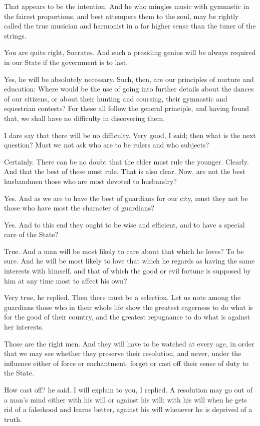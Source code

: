 That appears to be the intention.
And he who mingles music with gymnastic in the fairest proportions, and best attempers them to the soul, may be rightly called the true musician and harmonist in a far higher sense than the tuner of the strings.

You are quite right, Socrates.
And such a presiding genius will be always required in our State if the government is to last.

Yes, he will be absolutely necessary.
Such, then, are our principles of nurture and education: Where would be the use of going into further details about the dances of our citizens, or about their hunting and coursing, their gymnastic and equestrian contests? For these all follow the general principle, and having found that, we shall have no difficulty in discovering them.

I dare say that there will be no difficulty.
Very good, I said; then what is the next question? Must we not ask who are to be rulers and who subjects?

Certainly.
There can be no doubt that the elder must rule the younger.
Clearly.
And that the best of these must rule.
That is also clear.
Now, are not the best husbandmen those who are most devoted to husbandry?

Yes.
And as we are to have the best of guardians for our city, must they not be those who have most the character of guardians?

Yes.
And to this end they ought to be wise and efficient, and to have a special care of the State?

True.
And a man will be most likely to care about that which he loves?
To be sure.
And he will be most likely to love that which he regards as having the same interests with himself, and that of which the good or evil fortune is supposed by him at any time most to affect his own?

Very true, he replied.
Then there must be a selection. Let us note among the guardians those who in their whole life show the greatest eagerness to do what is for the good of their country, and the greatest repugnance to do what is against her interests.

Those are the right men.
And they will have to be watched at every age, in order that we may see whether they preserve their resolution, and never, under the influence either of force or enchantment, forget or cast off their sense of duty to the State.

How cast off? he said.
I will explain to you, I replied. A resolution may go out of a man's mind either with his will or against his will; with his will when he gets rid of a falsehood and learns better, against his will whenever he is deprived of a truth.

